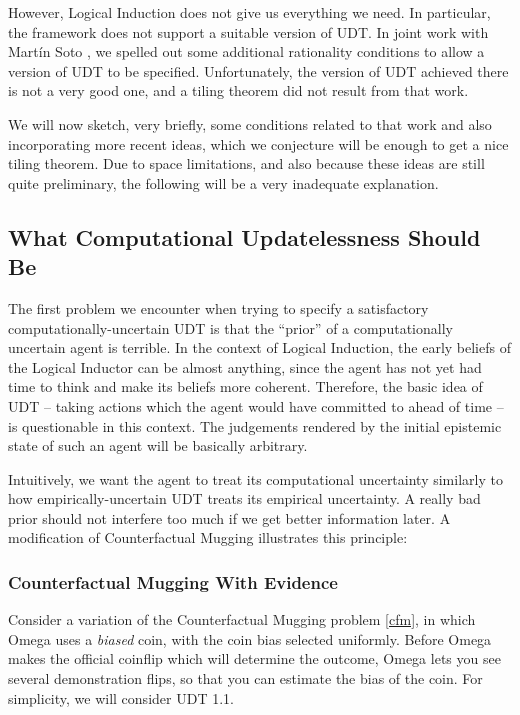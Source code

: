 \documentclass{article}
\begin{document}
However, Logical Induction does not give us everything we need. In particular, the framework does not support a suitable version of UDT. In joint work with Martín Soto \cite{soto2023logically}, we spelled out some additional rationality conditions to allow a version of UDT to be specified. Unfortunately, the version of UDT achieved there is not a very good one, and a tiling theorem did not result from that work.

We will now sketch, very briefly, some conditions related to that work and also incorporating more recent ideas, which we conjecture will be enough to get a nice tiling theorem. Due to space limitations, and also because these ideas are still quite preliminary, the following will be a very inadequate explanation.

\subsection{What Computational Updatelessness Should Be}

The first problem we encounter when trying to specify a satisfactory computationally-uncertain UDT is that the ``prior'' of a computationally uncertain agent is terrible. In the context of Logical Induction, the early beliefs of the Logical Inductor can be almost anything, since the agent has not yet had time to think and make its beliefs more coherent. Therefore, the basic idea of UDT -- taking actions which the agent would have committed to ahead of time -- is questionable in this context. The judgements rendered by the initial epistemic state of such an agent will be basically arbitrary.

Intuitively, we want the agent to treat its computational uncertainty similarly to how empirically-uncertain UDT treats its empirical uncertainty. A really bad prior should not interfere too much if we get better information later. A modification of Counterfactual Mugging illustrates this principle:

\subsubsection{Counterfactual Mugging With Evidence}

Consider a variation of the Counterfactual Mugging problem \ref{cfm}, in which Omega uses a \emph{biased} coin, with the coin bias selected uniformly. Before Omega makes the official coinflip which will determine the outcome, Omega lets you see several demonstration flips, so that you can estimate the bias of the coin. For simplicity, we will consider UDT 1.1.
\end{document}
